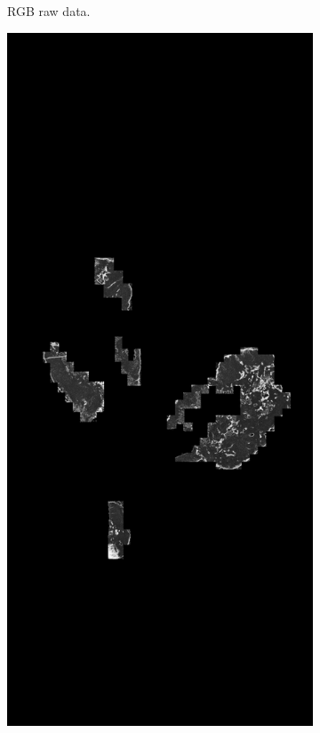 \documentclass[a4paper,10pt]{article}
\begin{document}
\begin{figure}[!ht]
\begin{subfigure}{.33\textwidth}
  \caption{RGB raw data.}
  \label{RawImage}
\end{subfigure}%
\begin{subfigure}{.33\textwidth}
  \centering
  \includegraphics[width=\linewidth]{whole_probmap_Test_002.png}

\end{subfigure}
\end{figure}
\end{document}
